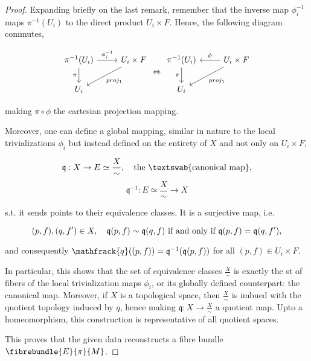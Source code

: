 \begin{proof}
    Expanding briefly on the last remark, remember that the inverse map $\phi_i^{-1}$ maps $\pi^{-1}(U_i)$ to the direct product $U_i \times F$. Hence, the following diagram commutes,

    \[
    \begin{tikzcd}
          \pi^{-1}(U_i) \arrow[d, "\pi"'] \arrow[r, "\phi_i^{-1}"] & U_i \times F \arrow[ld, "proj_1"] \\
                    U_i                                                 &            
        \end{tikzcd} \Leftrightarrow
    \begin{tikzcd}
	{\pi^{-1}(U_i)} & {U_i \times F} \\
	{U_i}
	\arrow["\phi"', from=1-2, to=1-1]
	\arrow["\pi"', from=1-1, to=2-1]
	\arrow["{proj_1}", from=1-2, to=2-1]
    \end{tikzcd}
    \]

    making $\pi \circ \phi$ the cartesian projection mapping. \medbreak
    
    Moreover, one can define a global mapping, similar in nature to the local trivializations $\phi_i$ but instead defined on the entirety of $X$ and not only on $U_i \times F$,
    
    $$
        \mathfrak{q} : X \rightarrow E \simeq \frac{X}{\sim}, \quad \textnormal{the \textswab{canonical map}},
    $$ 
    $$
        \mathfrak{q}^{-1}: E \simeq \frac{X}{\sim} \rightarrow X
    $$
    
    
    s.t. it sends points to their equivalence classes.
    It is a surjective map, i.e. 
    
    \[
        (p,f), (q,f') \in X, \quad \mathfrak{q} (p,f) \sim \mathfrak{q} (q,f)  \textnormal{ if and only if } \mathfrak{q}(p,f) = \mathfrak{q}(q,f'),
    \]

    and consequently $\mathfrack{q}((p,f)) = \mathfrak{q}^{-1}(\mathfrak{q}(p,f))$ for all $(p,f) \in U_i \times F$. \medbreak

    In particular, this shows that the set of equivalence classes $\frac{X}{\sim}$ is exactly the st of fibers of the local trivialization maps $\phi_i$, or its globally defined counterpart: the canonical map. 
    Moreover, if $X$ is a topological space, then $\frac{X}{\sim}$ is imbued with the quotient topology induced by $q$, hence making $\mathfrak{q}:X \rightarrow \frac{X}{\sim}$ a quotient map.
    Upto a homeomorphism, this construction is representative of all quotient spaces. \medbreak
    
    This proves that the given data reconstructs a fibre bundle $\fibrebundle{E}{\pi}{M}$.
\end{proof}

